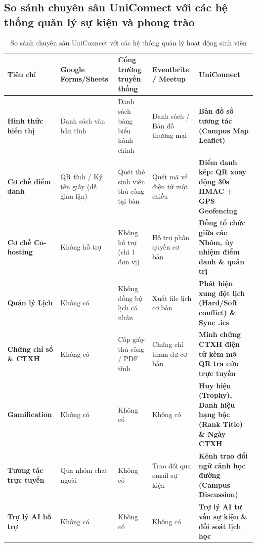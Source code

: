 \clearpage
\subsection{So sánh chuyên sâu UniConnect với các hệ thống quản lý sự kiện và phong trào}

\begin{table}[H]
\centering
\caption{So sánh chuyên sâu UniConnect với các hệ thống quản lý hoạt động sinh viên}
\label{tab:so-sanh-quan-ly-phong-trao}
\footnotesize
\renewcommand{\arraystretch}{1.0}
\begin{tabular}{|l|>{\raggedright\arraybackslash}p{2.5cm}|>{\raggedright\arraybackslash}p{2.5cm}|>{\raggedright\arraybackslash}p{2.5cm}|>{\raggedright\arraybackslash}p{2.8cm}|}
\hline
\textbf{Tiêu chí} & \textbf{Google Forms/Sheets} & \textbf{Cổng trường truyền thống} & \textbf{Eventbrite / Meetup} & \textbf{UniConnect} \\ \hline
\textbf{Hình thức hiển thị} & Danh sách văn bản tĩnh & Danh sách bảng biểu hành chính & Danh sách / Bản đồ thương mại & \textbf{Bản đồ số tương tác (Campus Map Leaflet)} \\ \hline
\textbf{Cơ chế điểm danh} & QR tĩnh / Ký tên giấy (dễ gian lận) & Quét thẻ sinh viên thủ công tại bàn & Quét mã vé điện tử một chiều & \textbf{Điểm danh kép: QR xoay động 30s HMAC + GPS Geofencing} \\ \hline
\textbf{Cơ chế Co-hosting} & Không hỗ trợ & Không hỗ trợ (chỉ 1 đơn vị) & Hỗ trợ phân quyền cơ bản & \textbf{Đồng tổ chức giữa các Nhóm, ủy nhiệm điểm danh \& quản trị} \\ \hline
\textbf{Quản lý Lịch} & Không có & Không đồng bộ lịch cá nhân & Xuất file lịch cơ bản & \textbf{Phát hiện xung đột lịch (Hard/Soft conflict) \& Sync .ics} \\ \hline
\textbf{Chứng chỉ số \& CTXH} & Không có & Cấp giấy thủ công / PDF tĩnh & Chứng chỉ tham dự cơ bản & \textbf{Minh chứng CTXH điện tử kèm mã QR tra cứu trực tuyến} \\ \hline
\textbf{Gamification} & Không có & Không có & Không có & \textbf{Huy hiệu (Trophy), Danh hiệu hạng bậc (Rank Title) \& Ngày CTXH} \\ \hline
\textbf{Tương tác trực tuyến} & Qua nhóm chat ngoài & Không có & Trao đổi qua email sự kiện & \textbf{Kênh trao đổi ngữ cảnh học đường (Campus Discussion)} \\ \hline
\textbf{Trợ lý AI hỗ trợ} & Không có & Không có & Không có & \textbf{Trợ lý AI tư vấn sự kiện \& đối soát lịch học} \\ \hline
\end{tabular}
\end{table}

